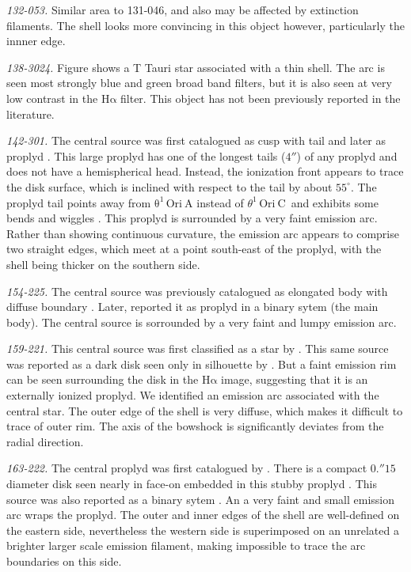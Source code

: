 \documentclass[apj, twocolumn]{aastex63}
\newcommand\ha{\ensuremath{\mathrm{H\alpha}}}
\newcommand\thC{\ensuremath{\theta^1\,\mathrm{Ori~C}}}
\begin{document}
\textit{132-053.}  Similar area to 131-046, and also may be affected
by extinction filaments. The shell looks more convincing in this
object however, particularly the innner edge.

\textit{138-3024.} Figure shows a T Tauri star associated with a
thin shell. The arc is seen most strongly blue and green broad
band filters, but it is also seen at very low contrast in the \ha{}
filter. This object has not been previously reported in the
literature.

\textit{142-301.} The central source was first catalogued as
cusp with tail \citep{ODell:1996a} and later as proplyd
\citep{Bally:2000a, Ricci:2008a}. This large proplyd has
one of the longest tails (\(4''\)) of any proplyd and does
not have a hemispherical head. Instead, the ionization front
appears to trace the disk surface, which is inclined with
respect to the tail by about $55^{\circ}$. The proplyd tail
points away from \(\mathrm{\theta^1\,Ori~A}\) instead of \thC~and
exhibits some bends and wiggles \citep{Bally:2000a}. This proplyd
is surrounded by a very faint emission arc.  Rather than showing
continuous curvature, the emission arc appears to comprise two
straight edges, which meet at a point south-east of the proplyd,
with the shell being thicker on the southern side.

\textit{154-225.} The central source was previously catalogued
as elongated body with diffuse boundary \citep{ODell:1996a}.
Later, \citet{Ricci:2008a} reported it as proplyd in a binary
sytem (the main body). The central source is sorrounded by a
very faint and lumpy emission arc.

\textit{159-221.} This central source was first classified as
a star by \citet{ODell:1996a}. This same source was reported as
a dark disk seen only in silhouette by \citet{Ricci:2008a}.
But a faint emission rim can be seen surrounding the disk in
the \ha{} image, suggesting that it is an externally ionized
proplyd. We identified an emission arc associated with the
central star. The outer edge of the shell is very diffuse,
which  makes it difficult to trace of outer rim. The axis of
the bowshock is significantly deviates from the radial
direction.

\textit{163-222.} The central proplyd was first catalogued
by \citet{ODell:1996a}. There is a compact \(0.''15\) diameter
disk seen nearly in face-on embedded in this stubby
proplyd \citep{Bally:2000a, Ricci:2008a}.  This source
was also reported as a binary sytem \citep{Ricci:2008a}.
An a very faint and small emission arc wraps the proplyd.
The outer and inner edges of the shell are well-defined on
the eastern side, nevertheless the western side is superimposed
on an unrelated a brighter larger scale emission filament,
making impossible to trace the arc boundaries on this side.
\end{document}
